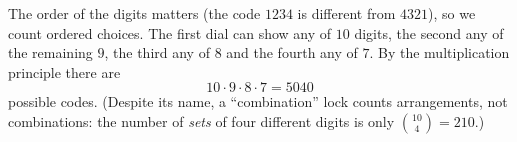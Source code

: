 The order of the digits matters (the code $1234$ is different from $4321$), so we count ordered choices. The first dial can show any of $10$ digits, the second any of the remaining $9$, the third any of $8$ and the fourth any of $7$. By the multiplication principle there are
\[
10\cdot9\cdot8\cdot7=\boxed{5040}
\]
possible codes. (Despite its name, a ``combination'' lock counts arrangements, not combinations: the number of \emph{sets} of four different digits is only $\binom{10}{4}=210$.)
